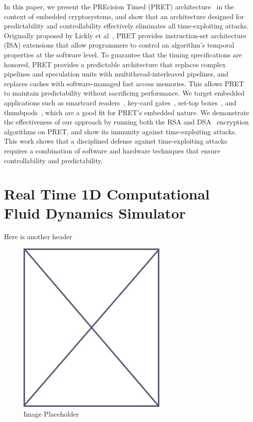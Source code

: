 In this paper, we present the PREcision Timed (PRET) architecture~\cite{pret_cases08} in the context of embedded cryptosystems, and show that an architecture designed for predictability and controllability effectively eliminates all time-exploiting attacks.
Originally proposed by Lickly et al~\cite{pret_cases08}, PRET provides instruction-set architecture (ISA) extensions that allow programmers to control an algorithm's temporal properties at the software level.
To guarantee that the timing specifications are honored, PRET provides a predictable architecture that replaces complex pipelines and speculation units with multithread-interleaved pipelines, and replaces caches with software-managed fast access memories.  
This allows PRET to maintain predictability without sacrificing performance.
We target embedded applications such as smartcard readers~\cite{99designprinciples}, key-card gates~\cite{rfidcrypto}, set-top boxes~\cite{99designprinciples}, and thumbpods~\cite{schaumont2003tts}, which are a good fit for PRET's embedded nature.
We demonstrate the effectiveness of our approach by running both the RSA and DSA~\cite{dss} encryption algorithms on PRET, and show its immunity against time-exploiting attacks.
This work shows that a disciplined defense against time-exploiting attacks requires a combination of software and hardware techniques that ensure controllability and predictability.


\section{Real Time 1D Computational Fluid Dynamics Simulator}
\label{sec:1dCFD}

Here is another header


\begin{figure}
\begin{center}
\vspace{-32pt}
\includegraphics[scale=.45]{figs/placeholder}
\end{center}
\vspace{-12pt}
\caption{Image Placeholder}
\label{fig:placeholder_app}
\end{figure}
